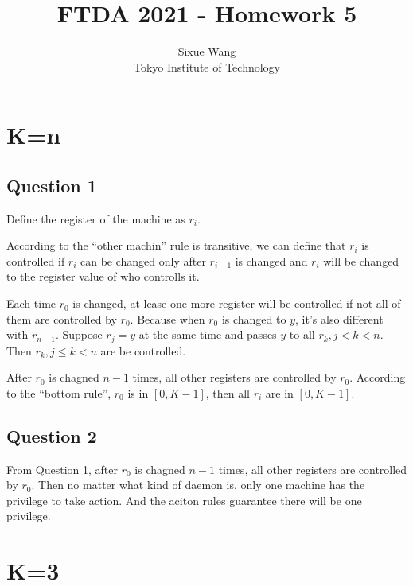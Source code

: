 \documentclass{article}
\title{FTDA 2021 - Homework 5}
\author{Sixue Wang\\Tokyo Institute of Technology}
\begin{document}
\maketitle

\section*{K=n}
\subsection*{Question 1}

Define the register of the machine as $r_i$.

According to the ``other machin'' rule is transitive, we can define that $r_i$ is controlled if $r_i$ can be changed only after $r_{i-1}$ is changed and $r_i$ will be changed to the register value of who controlls it.

Each time $r_0$ is changed, at lease one more register will be controlled if not all of them are controlled by $r_0$. Because when $r_0$ is changed to $y$, it’s also different with $r_{n-1}$. Suppose $r_j = y$ at the same time and passes $y$ to all $r_k, j<k<n$. Then $r_k, j \le k <n$ are be controlled.

After $r_0$ is chagned $n-1$ times, all other registers are controlled by $r_0$. According to the ``bottom rule'', $r_0$ is in $[0, K-1]$, then all $r_i$ are in $[0,K-1]$.

\subsection*{Question 2}
From Question 1, after $r_0$ is chagned $n-1$ times, all other registers are controlled by $r_0$. Then no matter what kind of daemon is, only one machine has the privilege to take action. And the aciton rules guarantee there will be one privilege.

\section*{K=3}
\end{document}
